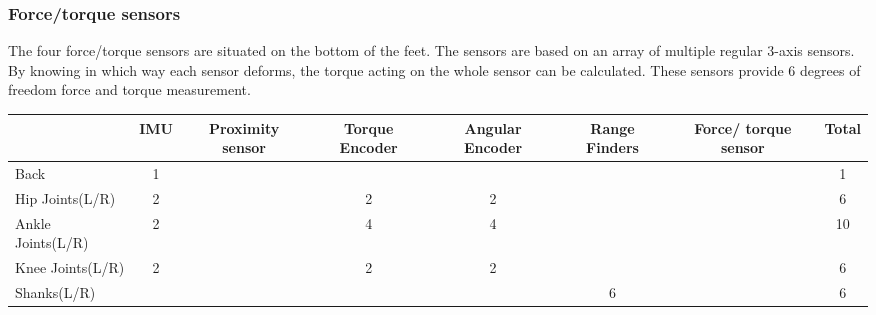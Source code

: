 \subsubsection{Force/torque sensors}
The four force/torque sensors are situated on the bottom of the feet. The sensors are based on an array of multiple regular 3-axis sensors. By knowing in which way each sensor deforms, the torque acting on the whole sensor can be calculated. These sensors provide 6 degrees of freedom force and torque measurement.

\begin{table}[]
	\centering
	\begin{tabular}{|l|c|c|c|c|c|c|c|}
		\hline
		& \multicolumn{1}{l|}{IMU} & \multicolumn{1}{p{15mm}|}{Proximity sensor} & \multicolumn{1}{p{15mm}|}{Torque Encoder} & \multicolumn{1}{p{15mm}|}{Angular Encoder} & \multicolumn{1}{p{15mm}|}{Range Finders} & \multicolumn{1}{p{15mm}|}{Force/ torque sensor} & \multicolumn{1}{l|}{Total} \\ \hline
		Back                  & 1                        &                                       &                                     &                                      &                                    &                                          & 1                          \\ \hline
		Hip Joints(L/R)       & 2                        &                                       & 2                                   & 2                                    &                                    &                                          & 6                          \\ \hline
		Ankle Joints(L/R)     & 2                        &                                       & 4                                   & 4                                    &                                    &                                          & 10                         \\ \hline
		Knee Joints(L/R)      & 2                        &                                       & 2                                   & 2                                    &                                    &                                          & 6                          \\ \hline
		Shanks(L/R)           &                          &                                       &                                     &                                      & 6                                  &                                          & 6                          \\ \hline

\end{tabular}
\end{table}
